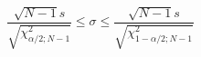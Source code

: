 

\[
\frac{\sqrt{N-1}s} {\sqrt{\chi_{\alpha/2;N-1}^{2}}} \le \sigma \le \frac{\sqrt{N-1}s} {\sqrt{\chi_{1-\alpha/2;N-1}^{2}}}
\]


